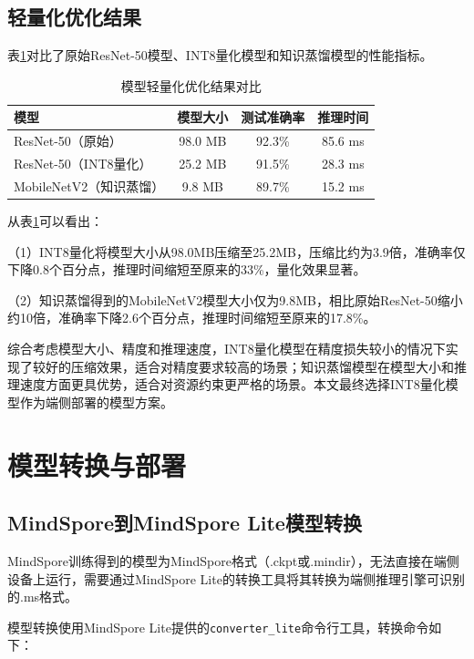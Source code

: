 \subsection{轻量化优化结果}

表\ref{tab:optimization_results}对比了原始ResNet-50模型、INT8量化模型和知识蒸馏模型的性能指标。

\begin{table}[htbp]
	\centering
	\caption{模型轻量化优化结果对比}
	\label{tab:optimization_results}
	\begin{tabular}{lccc}
		\toprule
		模型 & 模型大小 & 测试准确率 & 推理时间 \\
		\midrule
		ResNet-50（原始） & 98.0 MB & 92.3\% & 85.6 ms \\
		ResNet-50（INT8量化） & 25.2 MB & 91.5\% & 28.3 ms \\
		MobileNetV2（知识蒸馏） & 9.8 MB & 89.7\% & 15.2 ms \\
		\bottomrule
	\end{tabular}
\end{table}

从表\ref{tab:optimization_results}可以看出：

（1）INT8量化将模型大小从98.0MB压缩至25.2MB，压缩比约为3.9倍，准确率仅下降0.8个百分点，推理时间缩短至原来的33\%，量化效果显著。

（2）知识蒸馏得到的MobileNetV2模型大小仅为9.8MB，相比原始ResNet-50缩小约10倍，准确率下降2.6个百分点，推理时间缩短至原来的17.8\%。

综合考虑模型大小、精度和推理速度，INT8量化模型在精度损失较小的情况下实现了较好的压缩效果，适合对精度要求较高的场景；知识蒸馏模型在模型大小和推理速度方面更具优势，适合对资源约束更严格的场景。本文最终选择INT8量化模型作为端侧部署的模型方案。

\section{模型转换与部署}

\subsection{MindSpore到MindSpore Lite模型转换}

MindSpore训练得到的模型为MindSpore格式（.ckpt或.mindir），无法直接在端侧设备上运行，需要通过MindSpore Lite的转换工具将其转换为端侧推理引擎可识别的.ms格式。

模型转换使用MindSpore Lite提供的\texttt{converter\_lite}命令行工具，转换命令如下：

